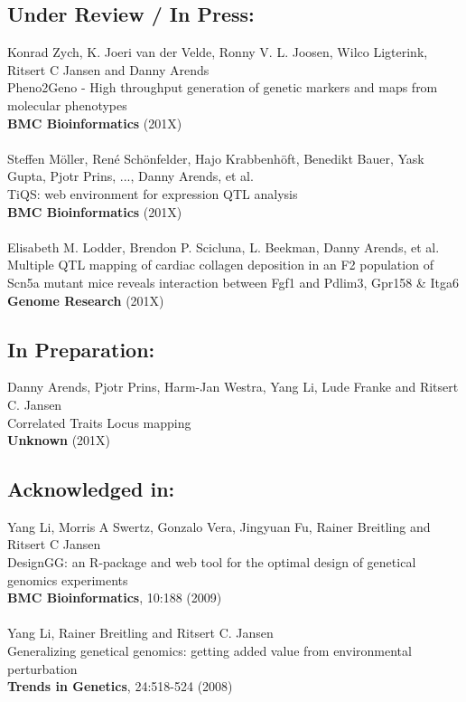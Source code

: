 \documentclass[8pt, twoside]{book}
\newcommand{\authors}[1]{\small{#1}}
\newcommand{\bold}[1]{{\bfseries #1}}
\begin{document}
\subsection*{Under Review / In Press:}
  \authors{Konrad Zych, K. Joeri van der Velde, Ronny V. L. Joosen, Wilco Ligterink, Ritsert C Jansen 
           and Danny Arends}\\
  Pheno2Geno - High throughput generation of genetic markers and maps from molecular phenotypes\\
  \bold{BMC Bioinformatics} (201X)\\\\
  \authors{Steffen M\"oller, Ren\'e Sch\"onfelder, Hajo Krabbenh\"oft, Benedikt Bauer, Yask Gupta, 
           Pjotr Prins, ..., Danny Arends, et al.}\\
  TiQS: web environment for expression QTL analysis\\
  \bold{BMC Bioinformatics} (201X)\\\\
  \authors{Elisabeth M. Lodder, Brendon P. Scicluna, L. Beekman, Danny Arends, et al.}\\
  Multiple QTL mapping of cardiac collagen deposition in an F2 population of Scn5a mutant mice reveals 
  interaction between Fgf1 and Pdlim3, Gpr158 \& Itga6\\
  \bold{Genome Research} (201X)

\subsection*{In Preparation:}
  \authors{Danny Arends, Pjotr Prins, Harm-Jan Westra, Yang Li, Lude Franke and Ritsert C. Jansen}\\
  Correlated Traits Locus mapping\\
  \bold{Unknown} (201X)

\subsection*{Acknowledged in:}
  \authors{Yang Li, Morris A Swertz, Gonzalo Vera, Jingyuan Fu, Rainer Breitling and Ritsert C Jansen}\\
  DesignGG: an R-package and web tool for the optimal design of genetical genomics experiments\\
  \bold{BMC Bioinformatics}, 10:188 (2009)\\\\
  \authors{Yang Li, Rainer Breitling and Ritsert C. Jansen}\\
  Generalizing genetical genomics: getting added value from environmental perturbation\\
  \bold{Trends in Genetics}, 24:518-524 (2008)


{\footnotesize

}
\end{document}

